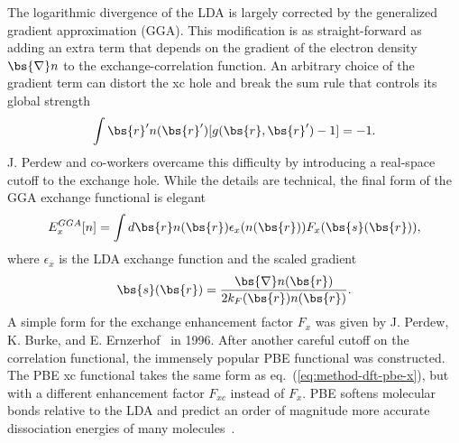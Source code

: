 The logarithmic divergence of the LDA is largely corrected by the generalized gradient approximation (GGA). This modification is as straight-forward as adding an extra term that depends on the gradient of the electron density $\bs{\nabla}n$ to the exchange-correlation function. An arbitrary choice of the gradient term can distort the xc hole and break the sum rule that controls its global strength
\begin{align}
\int\bs{r}' n(\bs{r}')[g(\bs{r},\bs{r}')-1] = -1.
\end{align}
J. Perdew and co-workers overcame this difficulty by introducing a real-space cutoff to the exchange hole. While the details are technical, the final form of the GGA exchange functional is elegant
\begin{align} \label{eq:method-dft-pbe-x}
E_x^{GGA}[n] = \int d\bs{r} n(\bs{r})\epsilon_x(n(\bs{r}))F_x(\bs{s}(\bs{r})),
\end{align}
where $\epsilon_x$ is the LDA exchange function and the scaled gradient
\begin{align}
\bs{s}(\bs{r}) = \dfrac{\bs{\nabla}n(\bs{r})}{2k_F(\bs{r})n(\bs{r})}.
\end{align}
A simple form for the exchange enhancement factor $F_x$ was given by J. Perdew, K. Burke, and E. Ernzerhof~\cite{Perdew1996} in 1996. After another careful cutoff on the correlation functional, the immensely popular PBE functional was constructed. The PBE xc functional takes the same form as eq.~(\ref{eq:method-dft-pbe-x}), but with a different enhancement factor $F_{xc}$ instead of $F_x$.
PBE softens molecular bonds relative to the LDA and predict an order of magnitude more accurate dissociation energies of many molecules~\cite{Perdew1996}.

